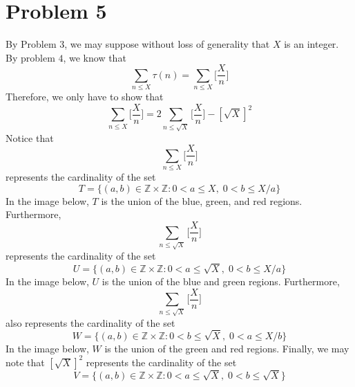 \documentclass[12pt]{article}
\newcommand{\Z}{\mathbb{Z}}
\begin{document}
\section*{Problem 5}
By Problem $3$, we may suppose without loss of generality that $X$ is an integer. By problem $4$, we know that
\[
\sum_{n \leq X} \tau(n) = \sum_{n\leq X} \bigg[\frac{X}{n}\bigg]
\] Therefore, we only have to show that
\[
\sum_{n\leq X} \bigg[\frac{X}{n}\bigg] = 2 \sum_{n \leq \sqrt{X}} \bigg[\frac{X}{n}\bigg] - [\sqrt{X}]^2 
\] Notice that
\[
\sum_{n\leq X} \bigg[\frac{X}{n}\bigg]
\] represents the cardinality of the set
\[
T = \{(a,b) \in \Z \times \Z: 0 < a \leq X,\; 0 < b \leq X/a\}
\] In the image below, $T$ is the union of the blue, green, and red regions. Furthermore, 
\[
\sum_{n \leq \sqrt{X}} \bigg[\frac{X}{n}\bigg]
\] represents the cardinality of the set
\[
U = \{(a,b) \in \Z \times \Z: 0 < a \leq \sqrt{X},\; 0 < b \leq X/a\}
\] In the image below, $U$ is the union of the blue and green regions. Furthermore,
\[
\sum_{n \leq \sqrt{X}} \bigg[\frac{X}{n}\bigg]
\]
also represents the cardinality of the set
\[
W = \{(a,b) \in \Z \times \Z: 0 < b \leq \sqrt{X},\; 0 < a \leq X/b\} 
\] In the image below, $W$ is the union of the green and red regions. Finally, we may note that $[\sqrt{X}]^2$ represents the cardinality of the set
\[
V = \{(a,b) \in \Z \times \Z: 0 < a \leq \sqrt{X},\; 0 < b \leq \sqrt{X}\}
\]
\end{document}
